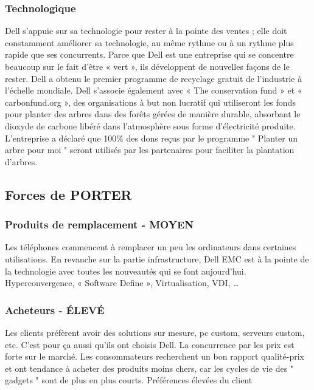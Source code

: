 \documentclass{bredele} %
\begin{document}
                    \subsubsection*{Technologique}
                    Dell s'appuie sur sa technologie pour rester à la pointe des ventes ; elle doit constamment améliorer sa technologie, au même rythme ou à un rythme plus rapide que ses concurrents.
    \newline
    Parce que Dell est une entreprise qui se concentre beaucoup sur le fait d'être « vert », ils développent de nouvelles façons de le rester. Dell a obtenu le premier programme de recyclage gratuit de l'industrie à l'échelle mondiale.
    \newline
    Dell s'associe également avec « The conservation fund » et « carbonfund.org », des organisations à but non lucratif qui utiliseront les fonds pour planter des arbres dans des forêts gérées de manière durable, absorbant le dioxyde de carbone libéré dans l'atmosphère sous forme d'électricité produite. L'entreprise a déclaré que 100\% des dons reçus par le programme " Planter un arbre pour moi " seront utilisés par les partenaires pour faciliter la plantation d'arbres.
                \subsection*{Forces de PORTER}
                    \subsubsection*{Produits de remplacement - MOYEN}
                    Les téléphones commencent à remplacer un peu les ordinateurs dans certaines utilisations. En revanche sur la partie infrastructure, Dell EMC est à la pointe de la technologie avec toutes les nouveautés qui se font aujourd’hui. Hyperconvergence, « Software Define », Virtualisation, VDI, …
                    \subsubsection*{Acheteurs - ÉLEVÉ}
                    Les clients préfèrent avoir des solutions sur mesure, pc custom, serveurs custom, etc. C’est pour ça aussi qu’ils ont choisis Dell.
    \newline
    La concurrence par les prix est forte sur le marché.
    \newline
    Les consommateurs recherchent un bon rapport qualité-prix et ont tendance à acheter des produits moins chers, car les cycles de vie des " gadgets " sont de plus en plus courts.
    \newline
    Préférences élevées du client
\end{document}
